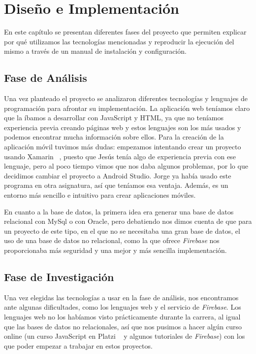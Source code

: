 \chapter{Diseño e Implementación}
\label{cap:Diseño-Implementacion}
\graphicspath{ {Imagenes/Figuras/} }

En este capítulo se presentan diferentes fases del proyecto que permiten explicar por qué utilizamos las tecnologías mencionadas y reproducir la ejecución del mismo a través de un manual de instalación y configuración.

\section{Fase de Análisis}
Una vez planteado el proyecto se analizaron diferentes tecnologías y lenguajes de programación para afrontar su implementación.
La aplicación web teníamos claro que la íbamos a desarrollar con JavaScript y HTML, ya que no teníamos experiencia previa creando páginas web y estos lenguajes son los más usados y podemos encontrar mucha información sobre ellos. Para la creación de la aplicación móvil tuvimos más dudas: empezamos intentando crear un proyecto usando Xamarin ~\citep{platzi}, puesto que Jesús tenía algo de experiencia previa con ese lenguaje, pero al poco tiempo vimos que nos daba algunos problemas, por lo que decidimos cambiar el proyecto a Android Studio. Jorge ya había usado este programa en otra asignatura, así que teníamos esa ventaja. Además, es un entorno más sencillo e intuitivo para crear aplicaciones móviles.

En cuanto a la base de datos, la primera idea era generar una base de datos relacional con MySql o con Oracle, pero debatiendo nos dimos cuenta de que para un proyecto de este tipo, en el que no se necesitaba una gran base de datos, el uso de una base de datos no relacional, como la que ofrece \textit{Firebase} nos proporcionaba más seguridad y una mejor y más sencilla implementación.

\section{Fase de Investigación}

Una vez elegidas las tecnologías a usar en la fase de análisis, nos encontramos ante algunas dificultades, como los lenguajes web y el servicio de \textit{Firebase}. Los lenguajes web no los habíamos visto prácticamente durante la carrera, al igual que las bases de datos no relacionales, así que nos pusimos a hacer algún curso online (un curso JavaScript en Platzi ~\citep{platzi} y algunos tutoriales de \textit{Firebase}) con los que poder empezar a trabajar en estos proyectos.

